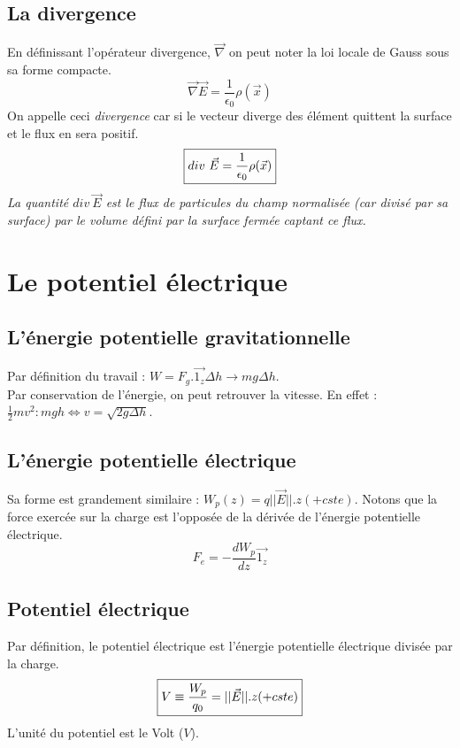 \documentclass	[11pt, a4paper, openany]{book}
\begin{document}
\subsection{La divergence}
En définissant l'opérateur divergence, $\vec{\nabla}$ on peut noter la loi locale de Gauss sous sa forme compacte.
\begin{equation}
	\vec{\nabla}\vec{E} = \frac{1}{\epsilon_0}\rho(\vec x)
\end{equation}
On appelle ceci \textit{divergence} car si le vecteur diverge des élément quittent la surface et le flux en sera positif.
\begin{equation}
	\fbox{$div\ \vec{E} = \dfrac{1}{\epsilon_0}\rho(\vec{x})$}
\end{equation}
\textit{La quantité $div\ \vec{E}$ est le flux de particules du champ normalisée (car divisé par sa surface) par le volume défini par la surface fermée captant ce flux.}


\section{Le potentiel électrique}
\subsection{L'énergie potentielle gravitationnelle}
Par définition du travail : $W = F_g.\vec{1_z}\Delta h \rightarrow mg\Delta h$.\\
Par conservation de l'énergie, on peut retrouver la vitesse. En effet : $\frac{1}{2}mv^2 : mgh \Leftrightarrow v = \sqrt{2g\Delta h}$.

\subsection{L'énergie potentielle électrique}
Sa forme est grandement similaire : $W_p(z) = q||\vec{E}||.z (+cste)$. Notons que la force exercée sur la charge est l'opposée de la dérivée de l'énergie potentielle électrique.
\begin{equation}
	F_e = - \frac{dW_p}{dz}\vec{1_z}
\end{equation}

\subsection{Potentiel électrique}
Par définition, le potentiel électrique est l'énergie potentielle électrique divisée par la charge.
\begin{equation}
	\fbox{$V \equiv \dfrac{W_p}{q_0} = ||\vec E||.z (+cste)$}
\end{equation}
L'unité du potentiel est le Volt ($V$).
\end{document}
